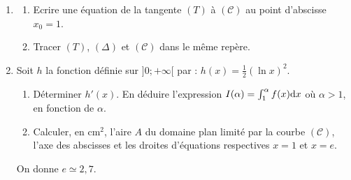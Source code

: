 \begin{description}
\begin{enumerate}
\begin{enumerate}
                                    \item Montrer que pour tout $x\in ]0;+\infty[$, $f'(x) = \frac{g(x)}{x^2}$
                                          o\`u $f$ d\'esigne la fonction d\'eriv\'ee de $f$.
                                    \item Justifier que $f'(x)$ \`a le m\^eme signe que $g(x)$ suivant les valeurs de $x$.
                                    \item Dresser le tableau de variation de $f$ sur $]0;+\infty[$.
                              \end{enumerate}
                        \item \begin{enumerate}
                                    \item Ecrire une \'equation de la tangente $(T)$ \`a $(\mathscr{C})$ 
                                          au point d'abscisse $x_0 = 1$.
                                    \item Tracer $(T)$, $(\Delta)$ et $(\mathscr{C})$ dans le m\^eme rep\`ere.
                              \end{enumerate}
                        \item Soit $h$ la fonction d\'efinie sur $]0;+\infty[$ par : $h(x) = \frac{1}{2} (\ln x)^2$.
                              \begin{enumerate}
                                    \item D\'eterminer $h'(x)$. En d\'eduire l'expression 
                                          $I(\alpha) = \int_{1}^{\alpha} f(x) \mathrm{d}x$ o\`u $\alpha > 1$, en fonction de $\alpha$.
                                    \item Calculer, en $\mathrm{cm}^2$, l'aire $A$ du domaine plan limit\'e par
                                          la courbe $(\mathscr{C})$, l'axe des abscisses et les droites 
                                          d'\'equations respectives $x=1$ et $x=e$.
                              \end{enumerate}
                        On donne $e \simeq 2,7$.
                  \end{enumerate}
      \end{description}












